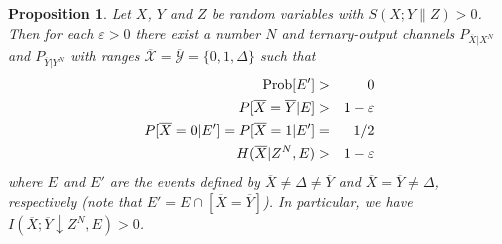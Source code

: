 \documentclass{article}
\newtheorem{prop}[theo]{Proposition}
\newcommand{\OX}{\overline{X}}
\newcommand{\OY}{\overline{Y}}
\begin{document}
\begin{prop}\label{prop2}
  Let $X$, $Y$ and $Z$ be random variables with $S(X;Y\|Z)>0$.
  Then for each $\varepsilon>0$ there exist a number $N$ and
  ternary-output channels $P_{\overline{X}|X^N}$ and $P_{\overline{Y}|Y^N}$ with
  ranges $\overline{\mathcal{X}} = \overline{\mathcal{Y}} = \{0, 1, \Delta\}$
  such that
  \begin{eqnarray}
{\rm Prob}[E'] & > & 0\\
    P[\overline{X} = \overline{Y} | E] & > & 1-\varepsilon \label{eq:skcond1} \\
    P[\overline{X} = 0 | E'] = P[\overline{X} = 1 | E'] & = & 1/2 \label{eq:skcond2}\\
    H(\overline{X} | Z^N, E) & > & 1-\varepsilon \label{eq:skcond3}
  \end{eqnarray}
  where $E$ and $E'$ are the events defined by $\overline{X} \neq \Delta
  \neq \overline{Y}$ and $\overline{X} = \overline{Y} \neq \Delta$, respectively (note
  that $E' = E \cap [\overline{X} = \overline{Y}]$). In particular, we have 
$I(\OX;\OY\downarrow Z^N,E)>0$.
\end{prop}
\end{document}
